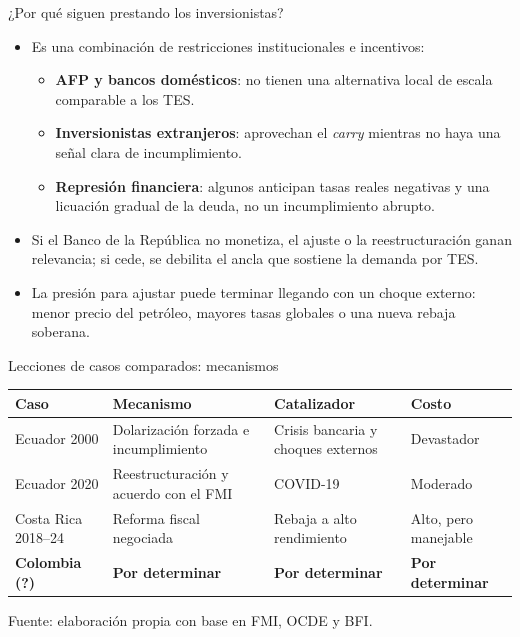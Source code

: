 \begin{frame}{¿Por qué siguen prestando los inversionistas?}
\small
\begin{itemize}
  \item Es una combinación de restricciones institucionales e incentivos:
  \begin{itemize}
    \item \textbf{AFP y bancos domésticos}: no tienen una alternativa local de escala comparable a los TES.
    \item \textbf{Inversionistas extranjeros}: aprovechan el \textit{carry} mientras no haya una señal clara de incumplimiento.
    \item \textbf{Represión financiera}: algunos anticipan tasas reales negativas y una licuación gradual de la deuda, no un incumplimiento abrupto.
  \end{itemize}
  \item Si el Banco de la República no monetiza, el ajuste o la reestructuración ganan relevancia; si cede, se debilita el ancla que sostiene la demanda por TES.
  \item La presión para ajustar puede terminar llegando con un choque externo: menor precio del petróleo, mayores tasas globales o una nueva rebaja soberana.
\end{itemize}
\end{frame}

\begin{frame}{Lecciones de casos comparados: mecanismos}
\small
\centering
\begin{tabular}{l p{3.2cm} p{2.5cm} p{2.4cm}}
\toprule
\textbf{Caso} & \textbf{Mecanismo} & \textbf{Catalizador} & \textbf{Costo} \\
\midrule
Ecuador 2000 & Dolarización forzada e incumplimiento & Crisis bancaria y choques externos & Devastador \\
Ecuador 2020 & Reestructuración y acuerdo con el FMI & COVID-19 & Moderado \\
Costa Rica 2018--24 & Reforma fiscal negociada & Rebaja a alto rendimiento & Alto, pero manejable \\
\textbf{Colombia (?)} & \textbf{Por determinar} & \textbf{Por determinar} & \textbf{Por determinar} \\
\bottomrule
\end{tabular}

\vfill
\scriptsize Fuente: elaboración propia con base en FMI, OCDE y BFI.
\end{frame}

